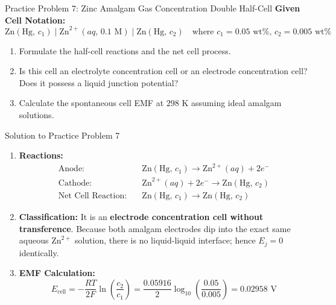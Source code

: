 \documentclass[10pt,a4paper]{article}
\begin{document}
\begin{exercisebox}{Practice Problem 7: Zinc Amalgam Gas Concentration Double Half-Cell}
\textbf{Given Cell Notation:}
\begin{equation*}
    \text{Zn}(\text{Hg},\, c_1) \mid \text{Zn}^{2+}(aq,\, 0.1\text{ M}) \mid \text{Zn}(\text{Hg},\, c_2) \quad \text{where } c_1 = 0.05\text{ wt\%},\, c_2 = 0.005\text{ wt\%}
\end{equation*}
\begin{enumerate}[label=(\alph*)]
    \item Formulate the half-cell reactions and the net cell process.
    \item Is this cell an electrolyte concentration cell or an electrode concentration cell? Does it possess a liquid junction potential?
    \item Calculate the spontaneous cell EMF at $298\text{ K}$ assuming ideal amalgam solutions.
\end{enumerate}
\end{exercisebox}

\begin{solutionbox}{Solution to Practice Problem 7}
\begin{enumerate}[label=(\alph*)]
    \item \textbf{Reactions:}
    \begin{align*}
        \text{Anode:} \quad & \text{Zn}(\text{Hg},\, c_1) \longrightarrow \text{Zn}^{2+}(aq) + 2e^- \\
        \text{Cathode:} \quad & \text{Zn}^{2+}(aq) + 2e^- \longrightarrow \text{Zn}(\text{Hg},\, c_2) \\
        \text{Net Cell Reaction:} \quad & \text{Zn}(\text{Hg},\, c_1) \longrightarrow \text{Zn}(\text{Hg},\, c_2)
    \end{align*}
    \item \textbf{Classification:} It is an \textbf{electrode concentration cell without transference}. Because both amalgam electrodes dip into the exact same aqueous $\text{Zn}^{2+}$ solution, there is no liquid-liquid interface; hence $E_j = 0$ identically.
    \item \textbf{EMF Calculation:}
    $$E_{\text{cell}} = -\frac{RT}{2F}\ln\left(\frac{c_2}{c_1}\right) = \frac{0.05916}{2}\log_{10}\left(\frac{0.05}{0.005}\right) = 0.02958\text{ V}$$
\end{enumerate}
\end{solutionbox}
\end{document}
